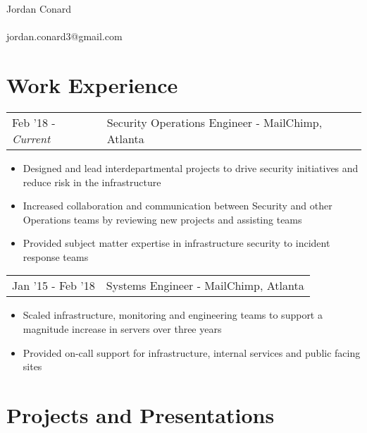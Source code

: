 \documentclass[letterpaper]{article}
\begin{document}
\pagestyle{empty} %


\begin{center}
    {\Huge Jordan Conard}\\~\\
    jordan.conard3@gmail.com\\
\end{center}

\section*{Work Experience}
\begin{tabular}{l|l}
{Feb '18 - \emph{Current}} & Security Operations Engineer - MailChimp, Atlanta
\end{tabular}
\begin{itemize}[noitemsep]
	\item Designed and lead interdepartmental projects to drive security initiatives and reduce risk in the infrastructure
	\item Increased collaboration and communication between Security and other Operations teams by reviewing new projects and assisting teams
	\item Provided subject matter expertise in infrastructure security to incident response teams
\end{itemize}
\begin{tabular}{l|l}
{Jan '15 - Feb '18} & Systems Engineer - MailChimp, Atlanta\\
\end{tabular}
\begin{itemize}[noitemsep]
	\item Scaled infrastructure, monitoring and engineering teams to support a magnitude increase in servers over three years
	\item Provided on-call support for infrastructure, internal services and public facing sites
\end{itemize}

\section*{Projects and Presentations}
\end{document}
